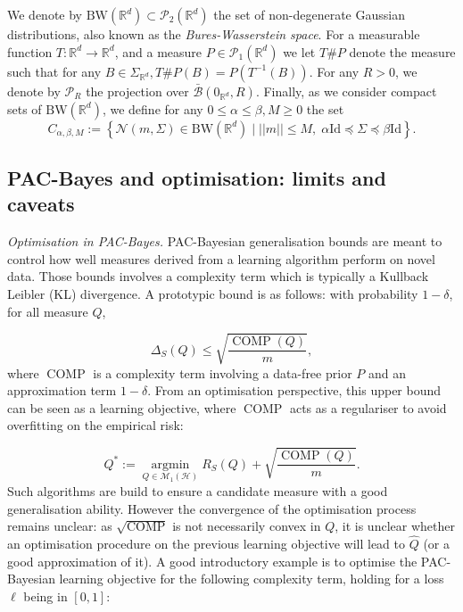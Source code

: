 We denote by $\text{BW}(\mathbb{R}^d)\subset \mathcal{P}_2(\mathbb{R}^d)$ the set of non-degenerate Gaussian distributions, also known as the \emph{Bures-Wasserstein space}. For a measurable function $T:\mathbb{R}^d \rightarrow \mathbb{R}^d$, and a measure $P\in\mathcal{P}_1(\mathbb{R}^d)$ we let $T\#P$ denote the measure such that for any $B\in \Sigma_{\mathbb{R}^d}, T\#P(B)= P(T^{-1}(B))$.
For any $R>0$, we denote by $\mathcal{P}_R$ the projection over $\bar{\mathcal{B}}(0_{\mathbb{R}^d},R)$.
Finally, as we consider compact sets of $\text{BW}(\mathbb{R}^d)$, we define for any $0\leq \alpha\leq \beta, M\geq 0$ the set
\[ C_{\alpha,\beta,M} := \left\{ \mathcal{N}(m,\Sigma) \in \text{BW}(\mathbb{R}^d) \mid ||m||\leq M,\; \alpha \mathrm{Id} \preceq \Sigma \preceq \beta \mathrm{Id} \right\}.  \]

\subsection{PAC-Bayes and optimisation: limits and caveats}
\label{sec: intro_optim}
\textit{Optimisation in PAC-Bayes.}
PAC-Bayesian generalisation bounds are meant to control how well measures derived from a learning algorithm perform on novel data.  Those bounds involves a complexity term which is typically a Kullback Leibler (KL) divergence. A prototypic bound is as follows: with probability $1-\delta$, for all measure $Q$,

$$\Delta_S(Q) \leq \sqrt{\frac{\operatorname{COMP}(Q)}{m}}, $$
where $\operatorname{COMP}$ is a complexity term involving a data-free prior $P$ and an approximation term $1-\delta$.
From an optimisation perspective, this upper bound can be seen as a learning objective, where $\operatorname{COMP}$ acts as a regulariser to avoid overfitting on the empirical risk:

$$ Q^* := \underset{Q\in\mathcal{M}_1(\mathcal{H})}{\operatorname{argmin}} R_S(Q) + \sqrt{\frac{\operatorname{COMP}(Q)}{m}}.$$
Such algorithms are build to ensure a candidate measure with a good generalisation ability.
However the convergence of the optimisation process remains unclear: as $\sqrt{\operatorname{COMP}}$ is not necessarily convex in $Q$, it is unclear whether an optimisation procedure on the previous learning objective will lead to $\hat{Q}$ (or a good approximation of it). A good introductory example is to optimise the PAC-Bayesian learning objective for the following complexity term, holding for a loss $\ell$ being in $[0,1]$:

